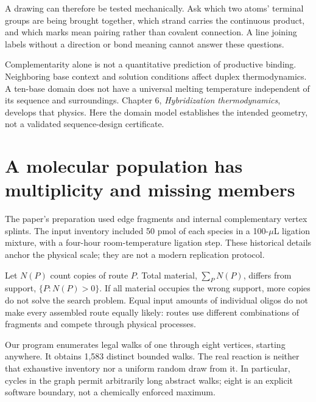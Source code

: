 A drawing can therefore be tested mechanically. Ask which two atoms' terminal groups are being brought together, which strand carries the continuous product, and which marks mean pairing rather than covalent connection. A line joining labels without a direction or bond meaning cannot answer these questions.

Complementarity alone is not a quantitative prediction of productive binding. Neighboring base context and solution conditions affect duplex thermodynamics.\cite{d2santalucia} A ten-base domain does not have a universal melting temperature independent of its sequence and surroundings. Chapter 6, \emph{Hybridization thermodynamics}, develops that physics. Here the domain model establishes the intended geometry, not a validated sequence-design certificate.

\section{A molecular population has multiplicity and missing members}
The paper's preparation used edge fragments and internal complementary vertex splints. The input inventory included 50 pmol of each species in a 100-$\mu$L ligation mixture, with a four-hour room-temperature ligation step.\cite{adleman} These historical details anchor the physical scale; they are not a modern replication protocol.


Let $N(P)$ count copies of route $P$. Total material, $\sum_P N(P)$, differs from support, $\{P:N(P)>0\}$. If all material occupies the wrong support, more copies do not solve the search problem. Equal input amounts of individual oligos do not make every assembled route equally likely: routes use different combinations of fragments and compete through physical processes.

Our program enumerates legal walks of one through eight vertices, starting anywhere. It obtains 1,583 distinct bounded walks. The real reaction is neither that exhaustive inventory nor a uniform random draw from it. In particular, cycles in the graph permit arbitrarily long abstract walks; eight is an explicit software boundary, not a chemically enforced maximum.


